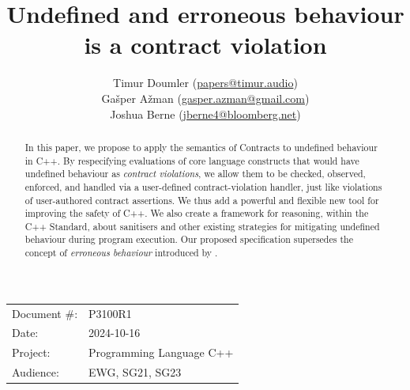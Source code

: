 

 \usepackage[bottom]{footmisc} 

 \usepackage{longtable}


\usepackage{tikz,lipsum,lmodern}
\usepackage[most]{tcolorbox}



\usepackage{titlesec}
\usepackage{tocloft}


\newcommand{\changelocaltocdepth}[1]{%
  \addtocontents{toc}{\protect\setcounter{tocdepth}{#1}}%
  \setcounter{tocdepth}{#1}%
}

\setcounter{tocdepth}{3}



\title{Undefined and erroneous behaviour is a contract violation}
\author{ Timur Doumler \small(\href{mailto:papers@timur.audio}{papers@timur.audio})  \\
Ga\v sper A\v zman \small(\href{mailto:gasper.azman@gmail.com}{gasper.azman@gmail.com})   \\
Joshua Berne \small(\href{mailto:jberne4@bloomberg.net}{jberne4@bloomberg.net})  
}
\date{}
\maketitle

\begin{tabular}{ll}
Document \#: & P3100R1 \\
Date: &2024-10-16 \\
Project: & Programming Language C++ \\
Audience: & EWG, SG21, SG23
\end{tabular}

\begin{abstract}
In this paper, we propose to apply the semantics of Contracts \cite{P2900R8} to undefined behaviour in C++. By respecifying evaluations of core language constructs that would have undefined behaviour as \emph{contract violations}, we allow them to be checked, observed, enforced, and handled via a user-defined contract-violation handler, just like violations of user-authored contract assertions. We thus add a powerful and flexible new tool for improving the safety of C++. We also create a framework for reasoning, within the C++ Standard, about sanitisers and other existing strategies for mitigating undefined behaviour during program execution. Our proposed specification supersedes the concept of \emph{erroneous behaviour} introduced by \cite{P2795R5}.
\end{abstract}

